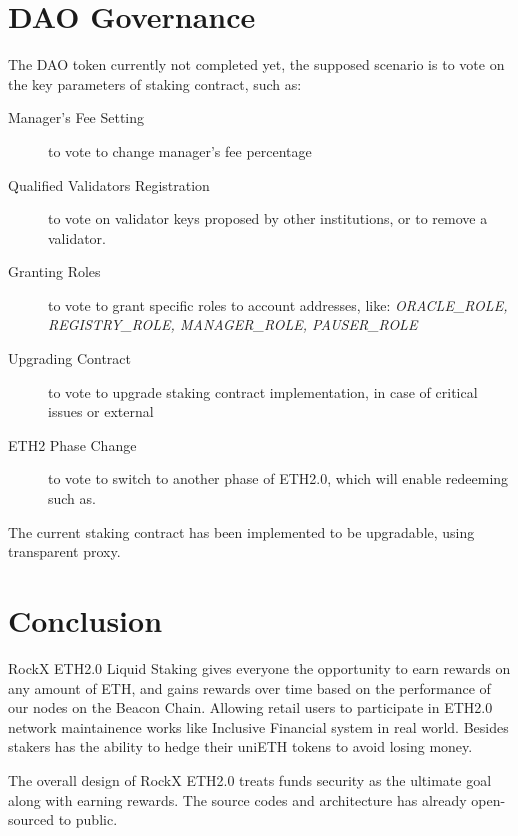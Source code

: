 \documentclass{article}
\begin{document}
\section{DAO Governance}
The DAO token currently not completed yet, the supposed scenario is to vote on the key parameters of staking contract, such as:

\begin{description}
   \item[Manager's Fee Setting] to vote to change manager's fee percentage
   \item[Qualified Validators Registration] to vote on validator keys proposed by other institutions, or to remove a validator.
	\item[Granting Roles] to vote to grant specific roles to account addresses, like: \textit{ORACLE\_ROLE, REGISTRY\_ROLE, MANAGER\_ROLE, PAUSER\_ROLE} 
	\item[Upgrading Contract] to vote to upgrade staking contract implementation, in case of critical issues or external
	\item[ETH2 Phase Change] to vote to switch to another phase of ETH2.0, which will enable redeeming such as.
\end{description}

The current staking contract has been implemented to be upgradable, using transparent proxy.

\section{Conclusion}
RockX ETH2.0 Liquid Staking gives everyone the opportunity to earn rewards on any amount of ETH,  and gains 
rewards over time based on the performance of our nodes on the Beacon Chain. Allowing retail users to
participate in ETH2.0 network maintainence works like Inclusive Financial system in real world. Besides stakers has 
the ability to hedge their uniETH tokens to avoid losing money.

The overall design of RockX ETH2.0 treats funds security as the ultimate goal along with earning rewards. The source 
codes and architecture has already open-sourced to public.

\newpage
\appendix
\end{document}
